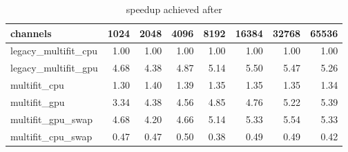 \begin{table}
  \caption{speedup achieved after}
  \begin{tabular}{lrrrrrrr}
    \toprule
    channels &  1024  &  2048  &  4096  &  8192  &  16384 &  32768 &  65536 \\
    \midrule
    legacy\_multifit\_cpu &   1.00 &   1.00 &   1.00 &   1.00 &   1.00 &   1.00 &   1.00 \\
    legacy\_multifit\_gpu &   4.68 &   4.38 &   4.87 &   5.14 &   5.50 &   5.47 &   5.26 \\
    multifit\_cpu        &   1.30 &   1.40 &   1.39 &   1.35 &   1.35 &   1.35 &   1.34 \\
  multifit\_gpu        &   3.34 &   4.38 &   4.56 &   4.85 &   4.76 &   5.22 &   5.39 \\
  multifit\_gpu\_swap   &   4.68 &   4.20 &   4.66 &   5.14 &   5.33 &   5.54 &   5.33 \\
  multifit\_cpu\_swap   &   0.47 &   0.47 &   0.50 &   0.38 &   0.49 &   0.49 &   0.42 \\
  \bottomrule
\end{tabular}
\end{table}
